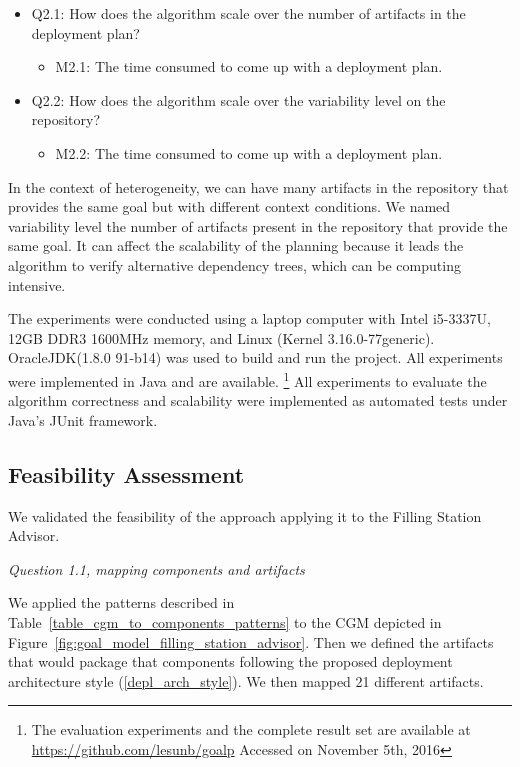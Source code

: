\begin{itemize}
  \item Q2.1: How does the algorithm scale over the number of artifacts in the deployment plan?
  \begin{itemize}
    \item M2.1: The time consumed to come up with a deployment plan.
  \end{itemize}

  \item Q2.2: How does the algorithm scale over the variability level on the repository?
  \begin{itemize}
    \item M2.2: The time consumed to come up with a deployment plan.
  \end{itemize}
\end{itemize}

In the context of heterogeneity, we can have many artifacts in the repository that provides the same goal but with different context conditions.
We named variability level the number of artifacts present in the repository that provide the same goal. It can affect the scalability of the planning because it leads the algorithm to verify alternative dependency trees, which can be computing intensive.

The experiments were conducted using a laptop computer with Intel i5-3337U, 12GB DDR3 1600MHz memory, and Linux (Kernel 3.16.0-77generic). OracleJDK(1.8.0 91-b14) was used to build and run the project. All experiments were implemented in Java and are available.
\footnote{The evaluation experiments and the complete result set are available at
\url{https://github.com/lesunb/goalp} Accessed on November 5th, 2016}
All experiments to evaluate the algorithm correctness and scalability
were implemented as automated tests under Java’s JUnit framework.

\subsection{Feasibility Assessment}

We validated the feasibility of the approach applying it to the Filling Station Advisor.

\emph{Question 1.1, mapping components and artifacts }

We applied the patterns described in Table~\ref{table_cgm_to_components_patterns} to the CGM depicted in Figure~\ref{fig:goal_model_filling_station_advisor}. Then we defined the artifacts that would package that components following the proposed deployment architecture style (\ref{depl_arch_style}). We then mapped 21 different artifacts.

